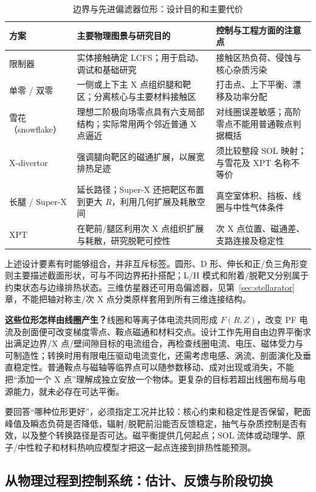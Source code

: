 \documentclass[12pt,fontset=none]{ctexart}
\numberwithin{equation}{section}
\numberwithin{table}{section}
\numberwithin{figure}{section}
\begin{document}
\begin{table}[!ht]
\centering\small
\caption{边界与先进偏滤器位形：设计目的和主要代价}\label{tab:edge-configs}
\begin{tabular}{L{2.5cm}L{5.3cm}L{5.2cm}}
\toprule
方案 & 主要物理图景与研究目的 & 控制与工程方面的注意点 \\
\midrule
限制器 & 实体接触确定 LCFS；用于启动、调试和基础研究 & 接触区热负荷、侵蚀与核心杂质污染 \\
单零 / 双零 & 一侧或上下主 X 点组织腿和靶区；分离核心与主要材料接触区 & 打击点、上下平衡、漂移及功率分配 \\
雪花（snowflake） & 理想二阶极向场零点具有六支局部结构；实际常用两个邻近普通 X 点逼近 & 对线圈误差敏感；高阶零点不能用普通鞍点判据概括 \\
X-divertor & 强调腿向靶区的磁通扩展，以展宽排热足迹 & 须比较整段 SOL 映射；与雪花及 XPT 名称不等价 \\
长腿 / Super-X & 延长路径；Super-X 还把靶区布置到更大 $R$，利用几何扩展及耗散空间 & 真空室体积、挡板、线圈与中性气体条件 \\
XPT & 在靶前/腿区利用次 X 点组织扩展与耗散，研究脱靶可控性 & 次 X 点位置、磁通差、支路连接及稳定性 \\
\bottomrule
\end{tabular}
\end{table}

上述设计要素有时能够组合，并非互斥标签。圆形、D 形、伸长和正/负三角形变则主要描述截面形状，可与不同边界拓扑搭配；L/H 模式和附着/脱靶又分别属于约束状态与边缘排热状态。三维仿星器还可用岛偏滤器，见第~\ref{sec:stellarator} 章，不能把轴对称主/次 X 点分类原样套用到所有三维连接结构。

\textbf{这些位形怎样由线圈产生？}线圈和等离子体电流共同形成 $F(R,Z)$，改变 PF 电流及剖面便可改变梯度零点、鞍点磁通和材料交点。设计工作先用自由边界平衡求出满足边界/X 点/壁间隙目标的电流组合，再检查线圈电流、电压、磁体受力与可制造性；转换时用有限电压驱动电流变化，还需考虑电感、涡流、剖面演化及垂直稳定性。普通鞍点与磁轴等临界点可以随参数移动、成对出现或消失，不能把``添加一个 X 点''理解成独立安放一个物体。更复杂的目标若超出线圈布局与电源能力，就未必存在可达平衡。

要回答``哪种位形更好''，必须指定工况并比较：核心约束和稳定性是否保留，靶面峰值及瞬态负荷是否降低，辐射/脱靶前沿能否反馈稳定，抽气与杂质控制是否有效，以及整个转换路径是否可达。磁平衡提供几何起点；SOL 流体或动理学、原子/中性粒子和材料热响应模型才把这一起点连接到排热性能预测。

\subsection{从物理过程到控制系统：估计、反馈与阶段切换}\label{sec:cycle-control}
\end{document}
